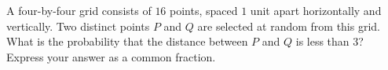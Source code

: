 A four-by-four grid consists of $16$ points, spaced $1$ unit apart horizontally and vertically. Two distinct points $P$ and $Q$ are selected at random from this grid. What is the probability that the distance between $P$ and $Q$ is less than $3$? Express your answer as a common fraction.
